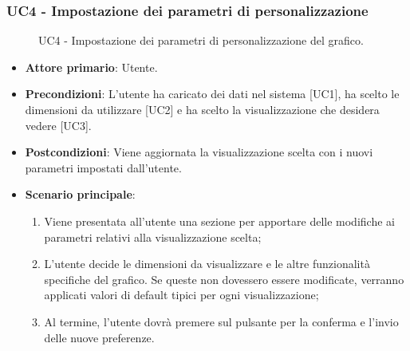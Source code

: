 \subsubsection{UC4 - Impostazione dei parametri di personalizzazione}
\begin{figure}[h]
\centering
\caption{UC4 - Impostazione dei parametri di personalizzazione del grafico.}
\end{figure}
\begin{itemize}
	\item \textbf{Attore primario}: Utente.
	\item \textbf{Precondizioni}: L'utente ha caricato dei dati nel sistema [UC1], ha scelto le dimensioni da utilizzare [UC2] e ha scelto la visualizzazione che desidera vedere [UC3].
	\item \textbf{Postcondizioni}: Viene aggiornata la visualizzazione scelta con i nuovi parametri impostati dall'utente.
	\item \textbf{Scenario principale}:
		\begin{enumerate}
			\item Viene presentata all'utente una sezione per apportare delle modifiche ai parametri relativi alla visualizzazione scelta;
			\item L'utente decide le dimensioni da visualizzare e le altre funzionalità specifiche del grafico. Se queste non dovessero essere modificate, verranno applicati valori di default tipici per ogni visualizzazione;
			\item Al termine, l'utente dovrà premere sul pulsante per la conferma e l'invio delle nuove preferenze.
		\end{enumerate}
\end{itemize}
